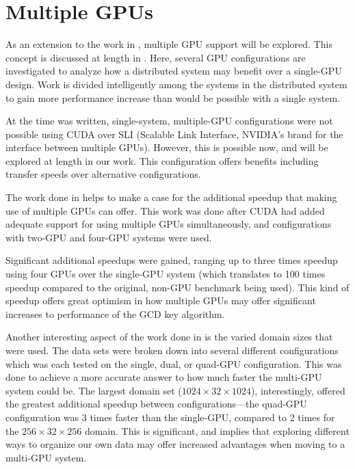 \documentclass[12pt]{ucthesis}
\begin{document}
\section{Multiple GPUs}
As an extension to the work in \cite{scharfglass2012breaking}, multiple GPU support
will be explored. This concept is discussed at length in
\cite{schaa2009exploring}. Here, several GPU configurations are investigated to
analyze how a distributed system may benefit over a single-GPU design.
Work is divided intelligently among the systems in the distributed system to
gain more performance increase than would be possible with a single system.

At the time \cite{schaa2009exploring} was written, single-system,
multiple-GPU configurations were not possible using CUDA over SLI (Scalable
Link Interface, NVIDIA's brand for the interface between multiple GPUs).
However, this is possible now, and will be explored at length in our work.
This configuration offers benefits including transfer speeds over alternative
configurations.

The work done in \cite{thibault2009cuda} helps to make a case for the
additional speedup that making use of multiple GPUs can offer. This work was
done after CUDA had added adequate support for using multiple GPUs
simultaneously, and configurations with two-GPU and four-GPU systems were used.

Significant additional speedups were gained, ranging up to three times speedup
using four GPUs over the single-GPU system (which translates to 100 times
speedup compared to the original, non-GPU benchmark being used). This kind of
speedup offers great optimism in how multiple GPUs may offer significant
increases to performance of the GCD key algorithm.

Another interesting aspect of the work done in \cite{thibault2009cuda} is the
varied domain sizes that were used. The data sets were broken down into several
different configurations which was each tested on the single, dual, or quad-GPU
configuration. This was done to achieve a more accurate answer to how much
faster the multi-GPU system could be. The largest domain set
($1024\times32\times1024$), interestingly, offered the greatest additional
speedup between configurations---the quad-GPU configuration was 3 times faster
than the single-GPU, compared to 2 times for the $256\times32\times256$
domain. This is significant, and implies that exploring different ways to
organize our own data may offer increased advantages when moving to a multi-GPU
system.
\end{document}
